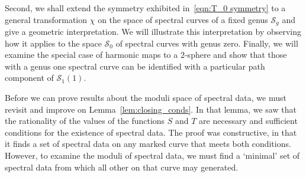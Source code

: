 Second, we shall extend the symmetry exhibited in~\eqref{eqn:T_0 symmetry} to a general transformation $χ$ on the space of spectral curves of a fixed genus $\mathcal{S}_g$ and give a geometric interpretation. We will illustrate this interpretation by observing how it applies to the space $\mathcal{S}_0$ of spectral curves with genus zero. Finally, we will examine the special case of harmonic maps to a $2$-sphere and show that those with a genus one spectral curve can be identified with a particular path component of $\mathcal{S}_1(1)$.

Before we can prove results about the moduli space of spectral data, we must revisit and improve on Lemma~\ref{lem:closing_conds}. In that lemma, we saw that the rationality of the values of the functions $S$ and $T$ are necessary and sufficient conditions for the existence of spectral data. The proof was constructive, in that it finds a set of spectral data on any marked curve that meets both conditions. However, to examine the moduli of spectral data, we must find a `minimal' set of spectral data from which all other on that curve may generated.

